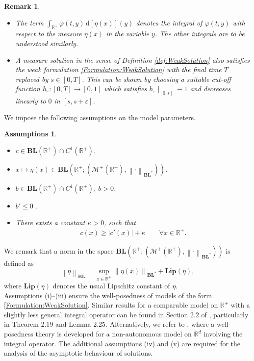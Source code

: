 \documentclass[12pt,a4paper]{amsart}
\newcommand{\ud}{\mathrm{d}}
\newtheorem{remark}[theorem]{Remark}
\newcommand{\BL}{\mathbf{BL}}
\newcommand{\BLN}{\mathbf{BL}}
\newcommand{\Lip}{\mathbf{Lip}} 				%
\newcommand{\reali}{\mathbb{R}}
\newcommand{\norma}[1]{{\left \|#1\right \|}}
\renewcommand{\phi}{\varphi}
\newtheorem{assumptions}[theorem]{Assumptions}
\newcommand{\R}{\mathbb{R}}
\begin{document}
\begin{remark}
\begin{itemize}
    \item [i)] The term $\int_{\reali^+} \phi(t,y) \,\ud{\left[\eta(x)\right]}(y)$ denotes the integral of $\phi(t,y)$ with respect to the measure $\eta(x)$ in the variable $y$. The other integrals are to be understood similarly.
    \item [ii)] A measure solution in the sense of Definition \eqref{def:WeakSolution} also satisfies the weak formulation \eqref{Formulation:WeakSolution} with the final time $T$ replaced by $s\in [0,T]$. This can be shown by choosing a suitable cut-off function $h_{\varepsilon}:[0,T]\to [0,1]$ which satisfies $h_{\varepsilon}\!\mid_{[0,s]}\equiv 1$ and  decreases linearly to $0$ in $[s,s+\varepsilon]$.
 \end{itemize}
 \end{remark}


\noindent We impose the following assumptions on the model parameters.
\begin{assumptions}\label{Assum} 
\ \begin{itemize}
\item[(i)] $c \in  \BL(\R^+)\cap C^1(\R^+)$.
\item[(ii)] $x\mapsto \eta(x) \in  \BL\left(\R^+; (\mathcal{M}^+(\R^+), \norma{\cdot}_{\BLN^*})\right)$.
\item[(iii)] $b \in  \BL(\R^+)\cap C^1(\R^+)$, $b>0$. 
\item[(iv)] $b' \leq 0$ .
\item [(v)] There exists a constant $\kappa>0$, such that 
    \begin{align*}
        c(x) \geq \left|c'(x)\right| + \kappa\qquad \forall x \in \R^+.
    \end{align*}
\end{itemize}
\end{assumptions}
\noindent 
We remark that a norm in the space $\BL\left(\R^+; (\mathcal{M}^+(\R^+), \norma{\cdot}_{\BLN^*})\right)$ is defined as
\begin{displaymath}
\norma{\eta}_{\BLN} = \sup_{x\in\reali^+}\norma{\eta(x)}_{\BLN^*} + \Lip(\eta),
\end{displaymath}
where $\Lip(\eta)$ denotes the usual Lipschitz constant of $\eta$. \\

\noindent Assumptions (i)–(iii) ensure the well-posedness of models of the form \eqref{Formulation:WeakSolution}. Similar results for a comparable model on $\mathbb{R}^+$ with a slightly less general integral operator can be found in Section 2.2 of \cite{Duell_book}, particularly in Theorem 2.19 and Lemma 2.25. Alternatively, we refer to \cite[Section 3.3]{Duell_thesis}, where a well-posedness theory is developed for a non-autonomous model on $\mathbb{R}^d$ involving the integral operator. The additional assumptions (iv) and (v) are required for the analysis of the asymptotic behaviour of solutions.\\
\end{document}
